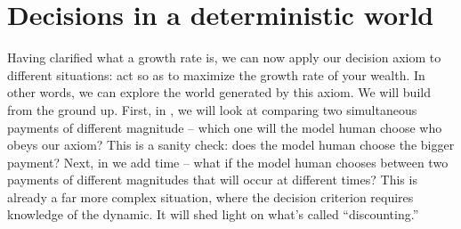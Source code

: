 %
%



\section{Decisions in a deterministic world}
Having clarified what a growth rate is, we can now apply our decision axiom to different situations: 
act so as to maximize the growth rate of your wealth. In other words, we can explore the world 
generated by this axiom. We will build from the ground up. First, in , 
we will look at comparing two simultaneous payments of different magnitude -- which one will the 
model human choose who obeys our axiom? This is a sanity check: does the model human 
choose the bigger payment? Next, in  we add time -- what if 
the model human chooses between two payments of different magnitudes that will occur at different 
times? This is already a far more complex situation, where the decision criterion requires knowledge 
of the dynamic. It will shed light on what's called ``discounting.'' 

